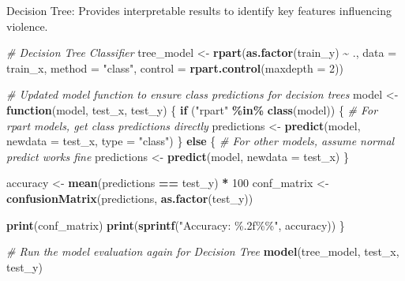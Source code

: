 \documentclass[
]{article}
\newenvironment{Shaded}{\begin{snugshade}}{\end{snugshade}}
\newcommand{\AttributeTok}[1]{\textcolor[rgb]{0.13,0.29,0.53}{#1}}
\newcommand{\CommentTok}[1]{\textcolor[rgb]{0.56,0.35,0.01}{\textit{#1}}}
\newcommand{\ControlFlowTok}[1]{\textcolor[rgb]{0.13,0.29,0.53}{\textbf{#1}}}
\newcommand{\DecValTok}[1]{\textcolor[rgb]{0.00,0.00,0.81}{#1}}
\newcommand{\FunctionTok}[1]{\textcolor[rgb]{0.13,0.29,0.53}{\textbf{#1}}}
\newcommand{\NormalTok}[1]{#1}
\newcommand{\OtherTok}[1]{\textcolor[rgb]{0.56,0.35,0.01}{#1}}
\newcommand{\SpecialCharTok}[1]{\textcolor[rgb]{0.81,0.36,0.00}{\textbf{#1}}}
\newcommand{\StringTok}[1]{\textcolor[rgb]{0.31,0.60,0.02}{#1}}
\begin{document}
Decision Tree: Provides interpretable results to identify key features
influencing violence.

\begin{Shaded}
\begin{Highlighting}[]
\CommentTok{\# Decision Tree Classifier}
\NormalTok{tree\_model }\OtherTok{\textless{}{-}} \FunctionTok{rpart}\NormalTok{(}\FunctionTok{as.factor}\NormalTok{(train\_y) }\SpecialCharTok{\textasciitilde{}}\NormalTok{ ., }\AttributeTok{data =}\NormalTok{ train\_x, }\AttributeTok{method =} \StringTok{"class"}\NormalTok{, }\AttributeTok{control =} \FunctionTok{rpart.control}\NormalTok{(}\AttributeTok{maxdepth =} \DecValTok{2}\NormalTok{))}

\CommentTok{\# Updated model function to ensure class predictions for decision trees}
\NormalTok{model }\OtherTok{\textless{}{-}} \ControlFlowTok{function}\NormalTok{(model, test\_x, test\_y) \{}
  \ControlFlowTok{if}\NormalTok{ (}\StringTok{"rpart"} \SpecialCharTok{\%in\%} \FunctionTok{class}\NormalTok{(model)) \{}
    \CommentTok{\# For rpart models, get class predictions directly}
\NormalTok{    predictions }\OtherTok{\textless{}{-}} \FunctionTok{predict}\NormalTok{(model, }\AttributeTok{newdata =}\NormalTok{ test\_x, }\AttributeTok{type =} \StringTok{"class"}\NormalTok{)}
\NormalTok{  \} }\ControlFlowTok{else}\NormalTok{ \{}
    \CommentTok{\# For other models, assume normal predict works fine}
\NormalTok{    predictions }\OtherTok{\textless{}{-}} \FunctionTok{predict}\NormalTok{(model, }\AttributeTok{newdata =}\NormalTok{ test\_x)}
\NormalTok{  \}}
  
\NormalTok{  accuracy }\OtherTok{\textless{}{-}} \FunctionTok{mean}\NormalTok{(predictions }\SpecialCharTok{==}\NormalTok{ test\_y) }\SpecialCharTok{*} \DecValTok{100}
\NormalTok{  conf\_matrix }\OtherTok{\textless{}{-}} \FunctionTok{confusionMatrix}\NormalTok{(predictions, }\FunctionTok{as.factor}\NormalTok{(test\_y))}
  
  \FunctionTok{print}\NormalTok{(conf\_matrix)}
  \FunctionTok{print}\NormalTok{(}\FunctionTok{sprintf}\NormalTok{(}\StringTok{"Accuracy: \%.2f\%\%"}\NormalTok{, accuracy))}
\NormalTok{\}}

\CommentTok{\# Run the model evaluation again for Decision Tree}
\FunctionTok{model}\NormalTok{(tree\_model, test\_x, test\_y)}
\end{Highlighting}
\end{Shaded}
\end{document}
